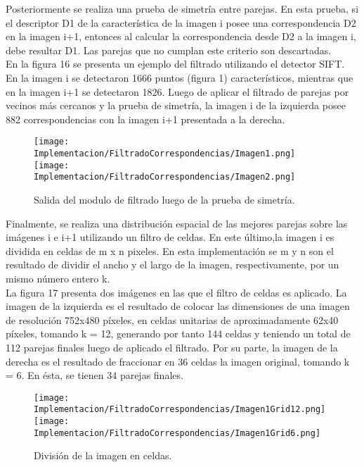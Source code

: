 Posteriormente se realiza una prueba de simetría entre parejas. En esta prueba, si el descriptor D1 de la característica  de la imagen i posee una correspondencia D2 en la imagen i+1, entonces al calcular la correspondencia desde D2 a la imagen i, debe resultar D1. Las parejas que no cumplan este criterio son descartadas.\\

En la figura 16 se presenta un ejemplo del filtrado  utilizando el detector SIFT. En la imagen i se detectaron 1666 puntos (figura 1) característicos, mientras que en la imagen i+1 se detectaron 1826. Luego de aplicar el filtrado de parejas por vecinos más cercanos y la prueba de simetría, la imagen i de la izquierda posee 882 correspondencias con la imagen i+1 presentada a la derecha.\\

\begin{figure}[H]
	
	\texttt{[image: Implementacion/FiltradoCorrespondencias/Imagen1.png]}
	\texttt{[image: Implementacion/FiltradoCorrespondencias/Imagen2.png]}
	\caption{Salida del modulo de filtrado luego de la prueba de simetría.}
	\label{fig:my_label}
\end{figure}


Finalmente, se realiza una distribución espacial de las mejores parejas  sobre las imágenes i e i+1 utilizando un filtro de celdas. En este último,la imagen i es dividida en celdas de m x n pixeles. En esta implementación se m y n son el resultado de dividir el ancho y el largo de la imagen, respectivamente, por un mismo número entero k. \\

La figura 17 presenta dos imágenes en las que el filtro de celdas es aplicado. La imagen de la izquierda es el resultado de colocar las dimensiones de una imagen de resolución 752x480 píxeles, en celdas unitarias de aproximadamente 62x40 píxeles,
tomando k = 12,  generando por tanto 144 celdas y teniendo un total de 112 parejas finales luego de aplicado el filtrado. Por su parte, la imagen de la derecha es el resultado de fraccionar en 36 celdas la imagen original, tomando k = 6. En ésta, se tienen 34 parejas finales. \\


\begin{figure}[H]
	
	\texttt{[image: Implementacion/FiltradoCorrespondencias/Imagen1Grid12.png]}
	\texttt{[image: Implementacion/FiltradoCorrespondencias/Imagen1Grid6.png]}
	\caption{División de la imagen en celdas.}
	\label{fig:my_label}
\end{figure}


